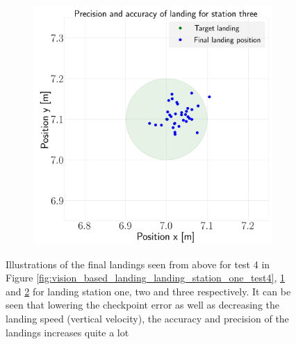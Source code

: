 \documentclass[../Head/report.tex]{subfiles}
\begin{document}
\begin{figure}[H]
\begin{subfigure}[t]{.30\textwidth}
        \caption{}
        \label{fig:vision_based_landing_landing_station_two_test4}
    \end{subfigure}
     \hspace{0.2em}
    \begin{subfigure}[t]{.30\textwidth}
        \centering
        \includegraphics[width=\textwidth]{../Figures/landing_test/test4_speed_0.1_error_0.05/landing_for_station_three.png}
        \caption{}
        \label{fig:vision_based_landing_landing_station_three_test4}
    \end{subfigure}
    \caption{Illustrations of the final landings seen from above for test 4 in Figure \ref{fig:vision_based_landing_landing_station_one_test4}, \ref{fig:vision_based_landing_landing_station_two_test4} and \ref{fig:vision_based_landing_landing_station_three_test4} for landing station one, two and three respectively. It can be seen that lowering the checkpoint error as well as decreasing the landing speed (vertical velocity), the accuracy and precision of the landings increases quite a lot}
    \label{fig:vision_based_landing_test4}
\end{figure}
\end{document}
